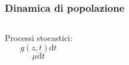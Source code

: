 \begin{frame}
  \frametitle{Dinamica di popolazione}
  \begin{columns}
    Processi stocastici:
    \[ g(z,t)\mathrm{d}t \]
    \[ \mu\mathrm{d}t \]
  \end{columns}

\end{frame}
